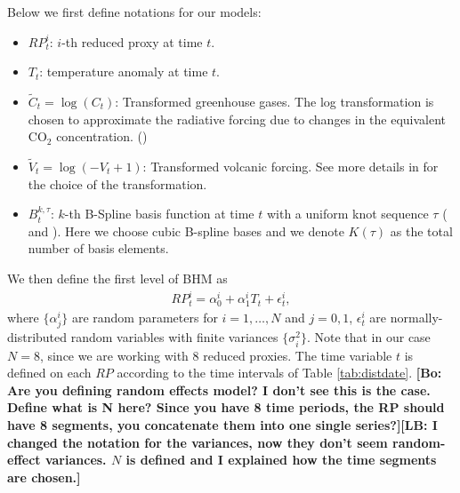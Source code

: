 \documentclass[11pt]{amsart}
\theoremstyle{plain}
\theoremstyle{definition}
\theoremstyle{remark}
\newcommand{\bl}[1]{\color{ForestGreen}\textbf{[Bo: #1]}\normalcolor}
\newcommand{\lb}[1]{\color{MidnightBlue}\textbf{[LB: #1]}\normalcolor}
\begin{document}
Below we first define notations for our models:
\begin{itemize}
\item $RP_t^i$: $i$-th reduced proxy at time $t$.
  
\item $T_t$: temperature anomaly at time $t$.
  
\item $\tilde C_t = \log (C_t)$: Transformed greenhouse gases. The log
  transformation is chosen to approximate the radiative forcing due to changes
  in the equivalent CO$_2$ concentration. (\cite{Barboza2014})
  
\item $\tilde V_t = \log (-V_t+1)$: Transformed volcanic forcing. See more details in \cite{Barboza2014} for the choice of the transformation.
  
\item $B_t^{k,\tau}$: $k$-th B-Spline basis function at time $t$ with a uniform knot
  sequence $\tau$ (\cite{DeBoor2001} and \cite{Ramsay2005}). Here we choose
  cubic B-spline bases and we denote $K(\tau)$ as the total number of basis elements.  
\end{itemize}
We then define the first level of BHM as
\begin{align*}
RP_t^i=\alpha_0^i+\alpha_1^iT_t+\epsilon^i_t,  
\end{align*}
where $\{\alpha^i_j\}$ are random parameters for $i=1,\ldots,N$ and $j=0,1$,  $\epsilon^i_t$ are normally-distributed random variables with finite variances
$\{\sigma^2_i\}$. Note that in our case $N=8$, since we are working with 8
reduced proxies. The time variable $t$ is defined on each $RP$ according to the
time intervals of Table \ref{tab:distdate}. \bl{Are you defining random effects model? I don't see this
  is the case. Define what is N here? Since you have 8 time periods, the RP
  should have 8 segments, you concatenate them into one single series?}\lb{I
  changed the notation for the variances, now they don't seem random-effect
  variances. $N$ is defined and I explained how the time segments are chosen.}
\end{document}
